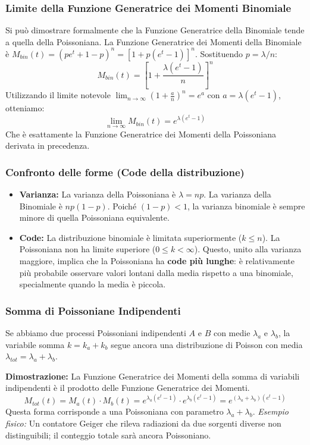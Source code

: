\documentclass{article}
\theoremstyle{remark}
\begin{document}
\subsubsection{Limite della Funzione Generatrice dei Momenti Binomiale}
Si può dimostrare formalmente che la Funzione Generatrice della Binomiale tende a quella della Poissoniana.
La Funzione Generatrice dei Momenti della Binomiale è $M_{bin}(t) = (pe^t + 1 - p)^n = [1 + p(e^t - 1)]^n$.
Sostituendo $p = \lambda/n$:
\[
M_{bin}(t) = \left[ 1 + \frac{\lambda(e^t - 1)}{n} \right]^n
\]
Utilizzando il limite notevole $\lim_{n \to \infty} (1 + \frac{a}{n})^n = e^a$ con $a = \lambda(e^t - 1)$, otteniamo:
\[
\lim_{n \to \infty} M_{bin}(t) = e^{\lambda(e^t - 1)}
\]
Che è esattamente la Funzione Generatrice dei Momenti della Poissoniana derivata in precedenza.

\subsubsection{Confronto delle forme (Code della distribuzione)}
\begin{itemize}
    \item \textbf{Varianza:} La varianza della Poissoniana è $\lambda = np$. La varianza della Binomiale è $np(1-p)$.
    Poiché $(1-p) < 1$, la varianza binomiale è sempre minore di quella Poissoniana equivalente.
    \item \textbf{Code:} La distribuzione binomiale è limitata superiormente ($k \le n$). La Poissoniana non ha limite superiore ($0 \le k < \infty$). Questo, unito alla varianza maggiore, implica che la Poissoniana ha \textbf{code più lunghe}: è relativamente più probabile osservare valori lontani dalla media rispetto a una binomiale, specialmente quando la media è piccola.
\end{itemize}

\subsubsection{Somma di Poissoniane Indipendenti}
Se abbiamo due processi Poissoniani indipendenti $A$ e $B$ con medie $\lambda_a$ e $\lambda_b$, la variabile somma $k = k_a + k_b$ segue ancora una distribuzione di Poisson con media $\lambda_{tot} = \lambda_a + \lambda_b$.

\textbf{Dimostrazione:} La Funzione Generatrice dei Momenti della somma di variabili indipendenti è il prodotto delle Funzione Generatrice dei Momenti.
\[
M_{tot}(t) = M_a(t) \cdot M_b(t) = e^{\lambda_a(e^t - 1)} \cdot e^{\lambda_b(e^t - 1)} = e^{(\lambda_a + \lambda_b)(e^t - 1)}
\]
Questa forma corrisponde a una Poissoniana con parametro $\lambda_a + \lambda_b$.
\textit{Esempio fisico:} Un contatore Geiger che rileva radiazioni da due sorgenti diverse non distinguibili; il conteggio totale sarà ancora Poissoniano.
\end{document}
